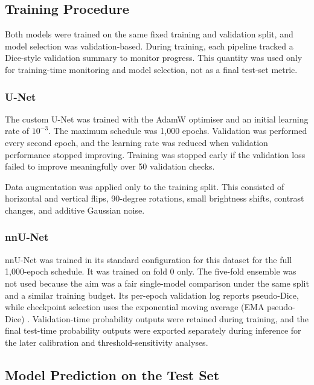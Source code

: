 \documentclass[logo,bsc,singlespacing,parskip,online]{infthesis}
\begin{document}
\subsection{Training Procedure}

Both models were trained on the same fixed training and validation split, and
model selection was validation-based. During training, each pipeline tracked a
Dice-style validation summary to monitor progress. This quantity was used only
for training-time monitoring and model selection, not as a final test-set
metric.

\subsubsection{U-Net}

The custom U-Net was trained with the AdamW optimiser
\citep{loshchilov2019decoupled} and an initial learning rate of $10^{-3}$. The
maximum schedule was 1,000 epochs. Validation was performed every second epoch,
and the learning rate was reduced when validation performance stopped
improving. Training was stopped early if the validation loss failed to improve
meaningfully over 50 validation checks.

Data augmentation was applied only to the training split. This consisted of
horizontal and vertical flips, 90-degree rotations, small brightness shifts,
contrast changes, and additive Gaussian noise. 

\subsubsection{nnU-Net}

nnU-Net was trained in its standard configuration for this dataset for the full
1,000-epoch schedule. It was trained on fold 0 only. The five-fold ensemble
was not used because the aim was a fair single-model comparison under the same
split and a similar training budget. Its per-epoch validation log reports
pseudo-Dice, while
checkpoint selection uses the exponential moving average (EMA pseudo-Dice)
\citep{isensee2021nnu}. Validation-time probability outputs were retained
during training, and the
final test-time probability outputs were exported separately during inference
for the later calibration and threshold-sensitivity analyses.

\subsection{Model Prediction on the Test Set}
\end{document}
